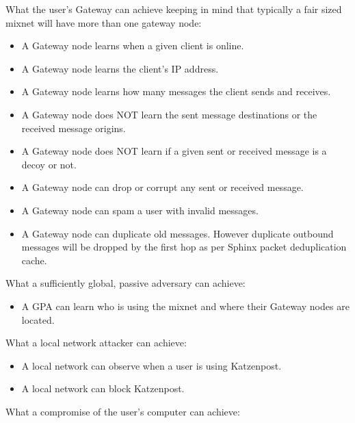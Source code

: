 \documentclass{article}
\begin{document}
\noindent What the user's Gateway can achieve keeping in mind that
typically a fair sized mixnet will have more than one gateway node:\\

\begin{itemize}
    \item A Gateway node learns when a given client is online.
    \item A Gateway node learns the client's IP address.
    \item A Gateway node learns how many messages the client sends and receives.
    \item A Gateway node does NOT learn the sent message destinations or the received message origins.
    \item A Gateway node does NOT learn if a given sent or received message is a decoy or not.
    \item A Gateway node can drop or corrupt any sent or received message.
    \item A Gateway node can spam a user with invalid messages.
    \item A Gateway node can duplicate old messages. However duplicate outbound messages will be dropped by the first hop as per Sphinx packet deduplication cache.
\end{itemize}
\vspace*{5px}

\noindent What a sufficiently global, passive adversary can achieve:\\

\begin{itemize}
    \item A GPA can learn who is using the mixnet and where their Gateway nodes are located.
\end{itemize}
\vspace*{5px}

What a local network attacker can achieve:\\

\begin{itemize}
    \item A local network can observe when a user is using Katzenpost.
    \item A local network can block Katzenpost.
\end{itemize}
\vspace*{5px}

\noindent What a compromise of the user's computer can achieve:\\
\end{document}
